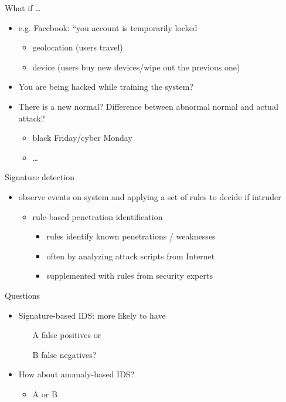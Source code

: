 \documentclass{beamer}
\begin{document}
\begin{frame}{What if \dots}
  \begin{itemize}
  \item e.g. Facebook: ``you account is temporarily locked
    \begin{itemize}
      \item geolocation (users travel)
      \item device (users buy new devices/wipe out the previous one)
    \end{itemize}
  \item You are being hacked while training the 
    system? 
  \item There is a new normal? Difference between 
    abnormal normal and actual attack?
    \begin{itemize}
      \item black Friday/cyber Monday
      \item \dots
    \end{itemize}
  \end{itemize}
\end{frame}

\begin{frame}{Signature detection}
  \begin{itemize}
  \item observe events on system and applying a set of 
    rules to decide if intruder 
    \begin{itemize}
    \item rule-based penetration identification 
      \begin{itemize}
      \item rules identify known penetrations / weaknesses 
      \item often by analyzing attack scripts from Internet 
      \item supplemented with rules from security experts 
      \end{itemize}
    \end{itemize}
  \end{itemize}
\end{frame}

\begin{frame}{Questions}
  \begin{itemize}
  \item Signature-based IDS: more likely to have 
    \begin{itemize}
    \item[A] false positives or 
    \item[B] false negatives? 
    \end{itemize}
  \item How about anomaly-based IDS? 
    \begin{itemize}
      \item A or B 
    \end{itemize}
  \end{itemize}
\end{frame}
\end{document}
